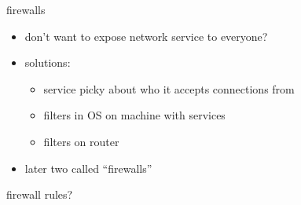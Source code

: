 \begin{frame}{firewalls}
    \begin{itemize}
    \item don't want to expose network service to everyone?
    \item solutions:
        \begin{itemize}
        \item service picky about who it accepts connections from
        \item filters in OS on machine with services
        \item filters on router
        \end{itemize}
    \item later two called ``firewalls''
    \end{itemize}
\end{frame}

\begin{frame}{firewall rules?}
\end{frame}
